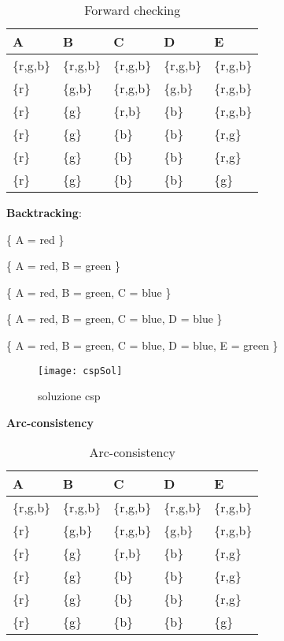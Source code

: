 \begin{table}[H]
\centering
\begin{tabular}{|l|l|l|l|l|}
\hline
A & B & C & D & E \\ \hline
\{r,g,b\} & \{r,g,b\} & \{r,g,b\} & \{r,g,b\} & \{r,g,b\} \\
\{r\} & \{g,b\} & \{r,g,b\} & \{g,b\} & \{r,g,b\} \\
\{r\} & \{g\} & \{r,b\} & \{b\} & \{r,g,b\} \\
\{r\} & \{g\} & \{b\} & \{b\} & \{r,g\} \\
\{r\} & \{g\} & \{b\} & \{b\} & \{r,g\} \\
\{r\} & \{g\} & \{b\} & \{b\} & \{g\} \\ \hline
\end{tabular}
\caption{Forward checking}
\end{table}

\textbf{Backtracking}:

\{ A = red \}

\{ A = red, B = green \}

\{ A = red, B = green, C = blue \}

\{ A = red, B = green, C = blue, D = blue \}

\{ A = red, B = green, C = blue, D = blue, E = green \}\\

\begin{figure}[H]
\centering
\texttt{[image: cspSol]}
\caption{soluzione csp}
\end{figure}

\textbf{Arc-consistency}

\begin{table}[H]
\centering
\begin{tabular}{|l|l|l|l|l|}
\hline
A & B & C & D & E \\ \hline
\{r,g,b\} & \{r,g,b\} & \{r,g,b\} & \{r,g,b\} & \{r,g,b\} \\
\{r\} & \{g,b\} & \{r,g,b\} & \{g,b\} & \{r,g,b\} \\
\{r\} & \{g\} & \{r,b\} & \{b\} & \{r,g\} \\
\{r\} & \{g\} & \{b\} & \{b\} & \{r,g\} \\
\{r\} & \{g\} & \{b\} & \{b\} & \{r,g\} \\
\{r\} & \{g\} & \{b\} & \{b\} & \{g\} \\ \hline
\end{tabular}
\caption{Arc-consistency}
\end{table}

